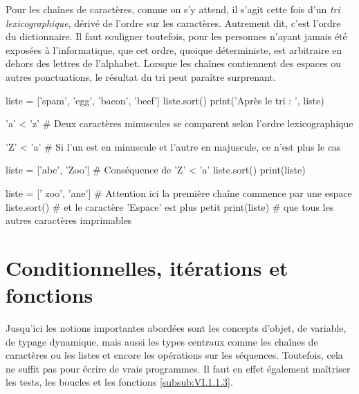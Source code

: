 Pour les chaînes de caractères, comme on s'y attend, il s'agit cette fois d'un \emph{tri lexicographique}, dérivé de l'ordre sur les caractères. Autrement dit, c'est l'ordre du dictionnaire. Il faut souligner toutefois, pour les personnes n'ayant jamais été exposées à l'informatique, que cet ordre, quoique déterministe, est arbitraire en dehors des lettres de l'alphabet.
Lorsque les chaînes contiennent des espaces ou autres ponctuations, le résultat du tri peut paraître surprenant.

\vspace{2pt}

\begin{idleconsole*}
\begin{pyconsole}
liste = ['spam', 'egg', 'bacon', 'beef']
liste.sort()
print('Après le tri : ', liste)

'a' < 'z' # Deux caractères minuscules se comparent selon l'ordre lexicographique

'Z' < 'a' # Si l'un est en minuscule et l'autre en majuscule, ce n'est plus le cas

liste = ['abc', 'Zoo'] # Conséquence de 'Z' < 'a'
liste.sort()
print(liste)

liste = [' zoo', 'ane'] # Attention ici la première chaîne commence par une espace
liste.sort()            # et le caractère 'Espace' est plus petit
print(liste)            # que tous les autres caractères imprimables

\end{pyconsole}
\end{idleconsole*}

\vfill\pagebreak

\section[\texorpdfstring{Introduction aux conditionnelles,\newline itérations et fonctions}{Introduction aux conditionnelles, itérations et fonctions}]{Conditionnelles, itérations et fonctions}
\label{sec:XI.3}

Jusqu'ici les notions importantes abordées sont les concepts d'objet, de variable, de typage dynamique, mais aussi les types centraux comme les chaînes de caractères ou les listes et encore les opérations sur les séquences. Toutefois, cela ne suffit pas pour écrire de vrais programmes. Il faut en effet également maîtriser les tests, les boucles et les fonctions  \cref{subsub:VI.1.1.3}.


